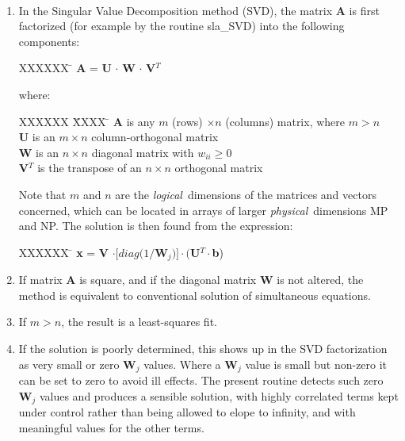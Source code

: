 {
  \\
}
\notes
{
 \begin{enumerate}
  \item In the Singular Value Decomposition method (SVD),
        the matrix {\bf A} is first factorized (for example by
        the routine sla\_SVD) into the following components:
        \begin{tabbing}
        XXXXXX \= \kill
        \> {\bf A} = {\bf U} $\cdot$ {\bf W} $\cdot$ {\bf V}$^{T}$
        \end{tabbing}
        where:
        \begin{tabbing}
        XXXXXX \= XXXX \= \kill
        \> {\bf A} \> is any $m$ (rows) $\times n$ (columns) matrix,
                      where $m > n$ \\
        \> {\bf U} \> is an $m \times n$ column-orthogonal matrix \\
        \> {\bf W} \> is an $n \times n$ diagonal matrix with
                      $w_{ii} \geq 0$ \\
        \> {\bf V}$^{T}$ \> is the transpose of an $n \times n$
                            orthogonal matrix
        \end{tabbing}
        Note that $m$ and $n$ are the {\it logical}\, dimensions of the
        matrices and vectors concerned, which can be located in
        arrays of larger {\it physical}\, dimensions MP and NP.
        The solution is then found from the expression:
        \begin{tabbing}
        XXXXXX \= \kill
        \> {\bf x} = {\bf V} $\cdot [diag(1/${\bf W}$_{j})]
           \cdot (${\bf U}$^{T} \cdot${\bf b})
        \end{tabbing}
  \item If matrix {\bf A} is square, and if the diagonal matrix {\bf W} is not
        altered, the method is equivalent to conventional solution
        of simultaneous equations.
  \item If $m > n$, the result is a least-squares fit.
  \item If the solution is poorly determined, this shows up in the
        SVD factorization as very small or zero {\bf W}$_{j}$ values.  Where
        a {\bf W}$_{j}$ value is small but non-zero it can be set to zero to
        avoid ill effects.  The present routine detects such zero
        {\bf W}$_{j}$ values and produces a sensible solution, with highly
        correlated terms kept under control rather than being allowed
        to elope to infinity, and with meaningful values for the
       other terms.
 \end{enumerate}
}
